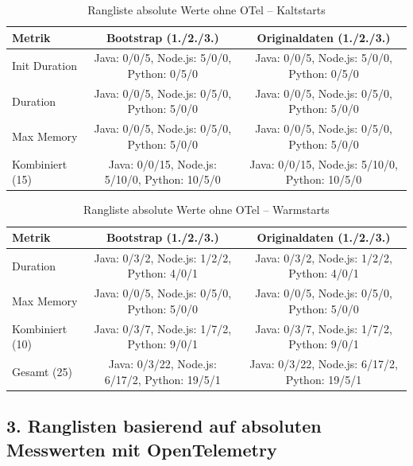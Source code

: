 \begin{table}[H]
\centering
\footnotesize
\setlength{\tabcolsep}{4pt}
\caption{Rangliste absolute Werte ohne OTel – Kaltstarts}
\label{app:ranking-without-otel-cold}
\begin{tabular}{|l|cc|}
\hline
\textbf{Metrik} & \textbf{Bootstrap (1./2./3.)} & \textbf{Originaldaten (1./2./3.)} \\
\hline
Init Duration & Java: 0/0/5, Node.js: 5/0/0, Python: 0/5/0 & Java: 0/0/5, Node.js: 5/0/0, Python: 0/5/0 \\
\hline
Duration      & Java: 0/0/5, Node.js: 0/5/0, Python: 5/0/0 & Java: 0/0/5, Node.js: 0/5/0, Python: 5/0/0 \\
\hline
Max Memory    & Java: 0/0/5, Node.js: 0/5/0, Python: 5/0/0 & Java: 0/0/5, Node.js: 0/5/0, Python: 5/0/0 \\
\hline
Kombiniert (15) & Java: 0/0/15, Node.js: 5/10/0, Python: 10/5/0 & Java: 0/0/15, Node.js: 5/10/0, Python: 10/5/0 \\
\hline
\end{tabular}
\end{table}

\begin{table}[H]
\centering
\footnotesize
\setlength{\tabcolsep}{4pt}
\caption{Rangliste absolute Werte ohne OTel – Warmstarts}
\label{app:ranking-without-otel-warm}
\begin{tabular}{|l|cc|}
\hline
\textbf{Metrik} & \textbf{Bootstrap (1./2./3.)} & \textbf{Originaldaten (1./2./3.)} \\
\hline
Duration      & Java: 0/3/2, Node.js: 1/2/2, Python: 4/0/1 & Java: 0/3/2, Node.js: 1/2/2, Python: 4/0/1 \\
\hline
Max Memory    & Java: 0/0/5, Node.js: 0/5/0, Python: 5/0/0 & Java: 0/0/5, Node.js: 0/5/0, Python: 5/0/0 \\
\hline
Kombiniert (10) & Java: 0/3/7, Node.js: 1/7/2, Python: 9/0/1 & Java: 0/3/7, Node.js: 1/7/2, Python: 9/0/1 \\
\hline
Gesamt (25)   & Java: 0/3/22, Node.js: 6/17/2, Python: 19/5/1 & Java: 0/3/22, Node.js: 6/17/2, Python: 19/5/1 \\
\hline
\end{tabular}
\end{table}

\subsection*{3. Ranglisten basierend auf absoluten Messwerten mit OpenTelemetry}

